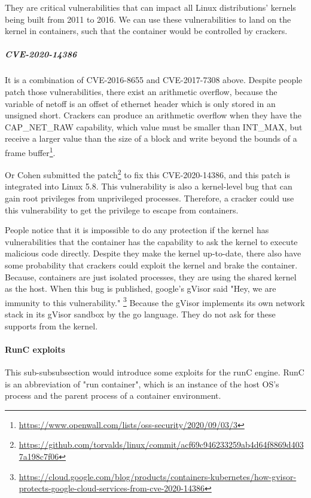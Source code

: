 They are critical vulnerabilities that can impact all Linux distributions' kernels being
built from 2011 to 2016. We can use these vulnerabilities to land on the kernel in
containers, such that the container would be controlled by crackers.

\subparagraph{CVE-2020-14386} It is a combination of CVE-2016-8655 and CVE-2017-7308 above.
Despite people patch those vulnerabilities, there exist an arithmetic overflow, because
the variable of netoff is an offset of ethernet header which is only stored in an unsigned
short. Crackers can produce an arithmetic overflow when they have the CAP\_NET\_RAW capability,
which value must be smaller than INT\_MAX, but receive a larger value than the size of a
block and write beyond the bounds of a frame buffer\footnote{\url{https://www.openwall.com/lists/oss-security/2020/09/03/3}}.

Or Cohen submitted the patch\footnote{\url{https://github.com/torvalds/linux/commit/acf69c946233259ab4d64f8869d4037a198c7f06}}
to fix this CVE-2020-14386, and this patch is integrated into Linux 5.8. This vulnerability
is also a kernel-level bug that can gain root privileges from unprivileged processes.
Therefore, a cracker could use this vulnerability to get the privilege to escape from containers.

People notice that it is impossible to do any protection if the kernel has vulnerabilities
that the container has the capability to ask the kernel to execute malicious code directly. Despite
they make the kernel up-to-date, there also have some probability that crackers could exploit
the kernel and brake the container. Because, containers are just isolated processes, they
are using the shared kernel as the host. When this bug is published, google's gVisor said
"Hey, we are immunity to this vulnerability." \footnote{\url{https://cloud.google.com/blog/products/containers-kubernetes/how-gvisor-protects-google-cloud-services-from-cve-2020-14386}}
Because the gVisor implements its own network stack in its gVisor sandbox by the go language.
They do not ask for these supports from the kernel.

\paragraph{RunC exploits}

This sub-subsubsection would introduce some exploits for the runC engine.
RunC is an abbreviation of "run container", which is an instance of the host OS's process and the
parent process of a container environment.

